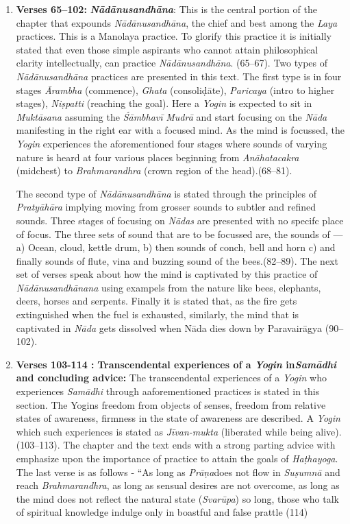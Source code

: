 \begin{enumerate}
\item \textbf{Verses 65--102:} \textit{\textbf{Nādānusandhāna}}: This is the central portion of the chapter that expounds \textit{Nādānusandhāna}, the chief and best among the \textit{Laya} practices. This is a Manolaya practice. To glorify this practice it is initially stated that even those simple aspirants who cannot attain philosophical clarity intellectually, can practice \textit{Nādānusandhāna}. (65--67). Two types of \textit{Nādānusandhāna} practices are presented in this text. The first type is in four stages \textit{Ārambha} (commence), \textit{Ghata} (consoliḍāte), \textit{Paricaya} (intro to higher stages), \textit{Niṣpatti} (reaching the goal). Here a \textit{Yogin} is expected to sit in \textit{Muktāsana} assuming the \textit{Śāmbhavī} \textit{Mudrā} and start focusing on the \textit{Nāda} manifesting in the right ear with a focused mind.  As the mind is focussed, the \textit{Yogin} experiences the aforementioned four stages where sounds of varying nature is heard at four various places beginning from \textit{Anāhatacakra} (midchest) to \textit{Brahmarandhra} (crown region of the head).(68--81).

The second type of \textit{Nādānusandhāna} is stated through the principles of \textit{Pratyāhāra} implying moving from grosser sounds to subtler and refined sounds. Three stages of focusing on \textit{Nādas} are presented with  no specifc place of focus. The three sets of sound that are to be focussed are, the sounds of --- a) Ocean, cloud, kettle drum, b) then sounds of conch, bell and horn c) and finally sounds of flute, vina and buzzing sound of the bees.(82--89). The next set of verses speak about how the mind is captivated by this practice of \textit{Nādānusandhānana} using exampels from the nature like bees, elephants, deers, horses and serpents. Finally it is stated that, as the fire gets extinguished when the fuel is exhausted, similarly, the mind that is captivated in \textit{Nāda} gets dissolved when Nāda dies down by Paravairāgya (90--102).
 
\item \textbf{Verses 103-114 :} \textbf{Transcendental experiences of a \textit{Yogin} in\break \textit{Samādhi} and concluding advice:} The transcendental experiences of a \textit{Yogin} who experiences \textit{Samādhi} through aaforementioned practices is stated in this section. The Yogins freedom from objects of senses, freedom from relative states of awareness, firmness in the state of awareness are described. A \textit{Yogin} which such experiences is stated as \textit{Jīvan-mukta} (liberated while being alive). (103--113). The chapter and the text ends with a strong parting advice with emphasize upon the importance of practice to attain the goals of \textit{Haṭhayoga}. The last verse is as follows - “As long as \textit{Prāṇa}does not flow in \textit{Suṣumnā} and reach \textit{Brahmarandhra}, as long as sensual desires are not overcome, as long as the mind does not reflect the natural state (\textit{Svarūpa}) so long, those who talk of spiritual knowledge indulge only in boastful and false prattle (114)   
\end{enumerate}
